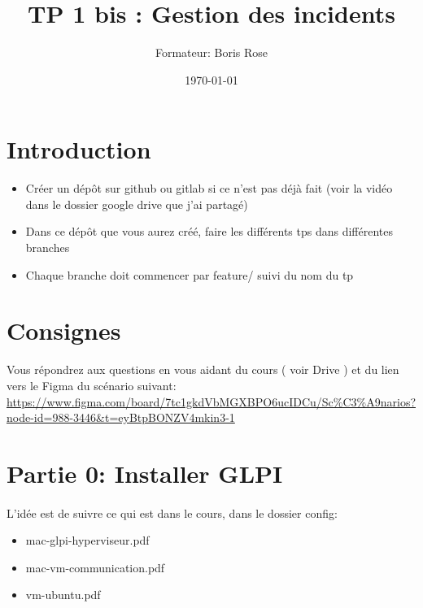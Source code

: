 \documentclass[12pt, letterpaper]{article}
\title{TP 1 bis : Gestion des incidents }
\author{Formateur: Boris Rose}
\date{\today}
\begin{document}
\maketitle

\section*{Introduction}

\begin{tcolorbox}[colback=brown!5,colframe=brown!60!black,title=Consignes]

\begin{itemize}
    \item Créer un dépôt sur github ou gitlab si ce n'est pas déjà fait (voir la vidéo dans le dossier google drive que j'ai partagé)
    \item Dans ce dépôt que vous aurez créé, faire les différents tps dans différentes branches
    \item Chaque branche doit commencer par feature/ suivi du nom du tp 
\end{itemize}

\end{tcolorbox}


\section*{Consignes}

\begin{tcolorbox}[colback=cyan!5,colframe=cyan!60!black,title=Figma d'étude]
    Vous répondrez aux questions en vous aidant du cours ( voir Drive ) et du lien vers le Figma du scénario suivant: 
    \url{https://www.figma.com/board/7tc1gkdVbMGXBPO6ucIDCu/Sc\%C3\%A9narios?node-id=988-3446&t=eyBtpBONZV4mkin3-1}
\end{tcolorbox}


\section*{Partie 0: Installer GLPI}
\paragraph{\color{red}{Si vous n'avez pas déjà fait cela dans le TP1}}

L'idée est de suivre ce qui est dans le cours, dans le dossier config:
\begin{itemize}
    \item mac-glpi-hyperviseur.pdf 
    \item mac-vm-communication.pdf
    \item vm-ubuntu.pdf
\end{itemize}
\end{document}
